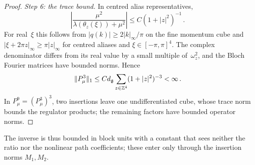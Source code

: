 \begin{proof}
\emph{Step 6: the trace bound.} In centred alias representatives,
\begin{equation*}
\left|\frac{\mu^2}{\lambda(\theta_z(\xi))+\mu^2}\right|\le C(1+|z|^2)^{-1}\,.
\end{equation*}
For real~$\xi$ this follows from $|q(k)|\ge2|k|_\infty/\pi$ on the fine momentum cube and $|\xi+2\pi z|_\infty\ge\pi|z|_\infty$ for centred aliases and $\xi\in[-\pi,\pi]^4$. The complex denominator differs from its real value by a small multiple of~$\omega_z^2$, and the Bloch Fourier matrices have bounded norms. Hence
\begin{equation*}
\|P_\mu^3\|_1\le Cd_{\mathfrak{g}}\sum_{z\in\mathbb{Z}^4}(1+|z|^2)^{-3}<\infty\,.
\end{equation*}
In $P_\mu^9=(P_\mu^3)^3$, two insertions leave one undifferentiated cube, whose trace norm bounds the regulator products; the remaining factors have bounded operator norms.
\end{proof}
The inverse is thus bounded in block units with a constant that sees neither the ratio nor the nonlinear path coefficients; these enter only through the insertion norms $M_1,M_2$.

